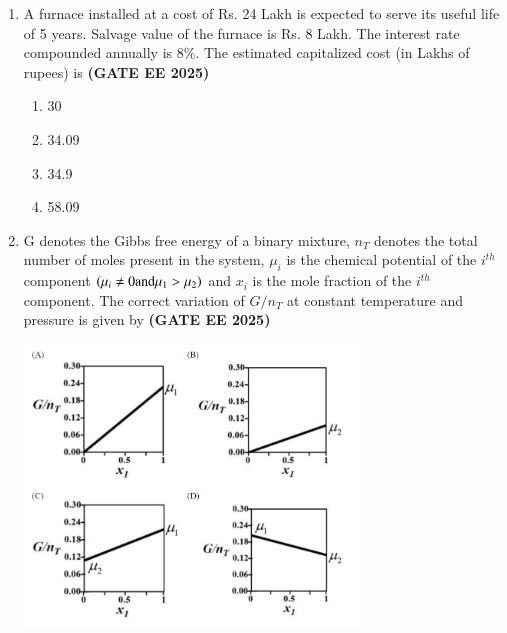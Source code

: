 \documentclass[journal,12pt,onecolumn]{IEEEtran}
\theoremstyle{remark}
\begin{document}
\begin{enumerate}
\item A furnace installed at a cost of Rs. 24 Lakh is expected to serve its useful life of 5 years. Salvage value of the furnace is Rs. 8 Lakh. The interest rate compounded annually is 8\%. The estimated capitalized cost (in Lakhs of rupees) is
\hfill \textbf{(GATE EE 2025)} \begin{enumerate}
    \item 30
    \item 34.09
    \item 34.9
    \item 58.09
\end{enumerate}


\item G denotes the Gibbs free energy of a binary mixture, $n_T$ denotes the total number of moles present in the system, $\mu_{i}$ is the chemical potential of the $i^{th}$ component $\left(\mu_{i}\ne0 \text{and} \mu_{1}>\mu_{2}\right)$ and $x_i$ is the mole fraction of the $i^{th}$ component. The correct variation of $G/n_{T}$  at constant temperature and pressure is given by \hfill \textbf{(GATE EE 2025)}
\begin{center}
\includegraphics[width=0.7\textwidth]{figs/29.png}
\end{center}



\end{enumerate}
\end{document}
